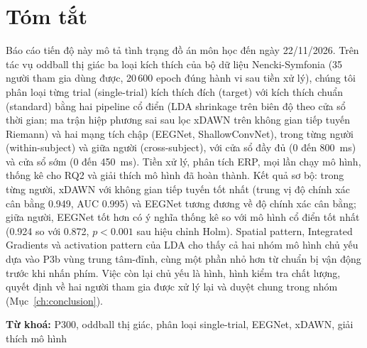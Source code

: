 \section*{Tóm tắt}
Báo cáo tiến độ này mô tả tình trạng đồ án môn học đến ngày 22/11/2026. Trên tác vụ oddball thị giác ba loại kích thích của bộ dữ liệu Nencki-Symfonia (35 người tham gia dùng được, 20\,600 epoch đúng hành vi sau tiền xử lý), chúng tôi phân loại từng trial (single-trial) kích thích đích (target) với kích thích chuẩn (standard) bằng hai pipeline cổ điển (LDA shrinkage trên biên độ theo cửa sổ thời gian; ma trận hiệp phương sai sau lọc xDAWN trên không gian tiếp tuyến Riemann) và hai mạng tích chập (EEGNet, ShallowConvNet), trong từng người (within-subject) và giữa người (cross-subject), với cửa sổ đầy đủ (0 đến 800~ms) và cửa sổ sớm (0 đến 450~ms). Tiền xử lý, phân tích ERP, mọi lần chạy mô hình, thống kê cho RQ2 và giải thích mô hình đã hoàn thành. Kết quả sơ bộ: trong từng người, xDAWN với không gian tiếp tuyến tốt nhất (trung vị độ chính xác cân bằng 0.949, AUC 0.995) và EEGNet tương đương về độ chính xác cân bằng; giữa người, EEGNet tốt hơn có ý nghĩa thống kê so với mô hình cổ điển tốt nhất (0.924 so với 0.872, $p < 0.001$ sau hiệu chỉnh Holm). Spatial pattern, Integrated Gradients và activation pattern của LDA cho thấy cả hai nhóm mô hình chủ yếu dựa vào P3b vùng trung tâm-đỉnh, cùng một phần nhỏ hơn từ chuẩn bị vận động trước khi nhấn phím. Việc còn lại chủ yếu là hình, hình kiểm tra chất lượng, quyết định về hai người tham gia được xử lý lại và duyệt chung trong nhóm (Mục~\ref{ch:conclusion}).

\noindent\textbf{Từ khoá:} P300, oddball thị giác, phân loại single-trial, EEGNet, xDAWN, giải thích mô hình
